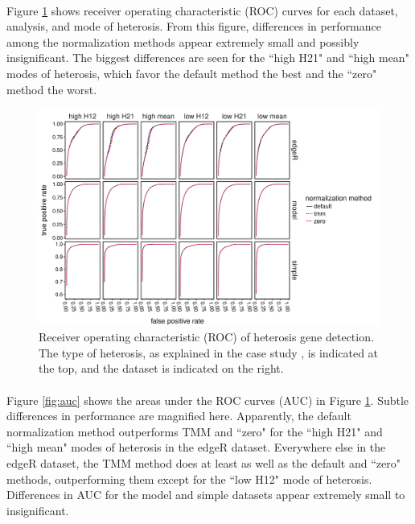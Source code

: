 \documentclass{article}
\begin{document}
\begin{flushleft}
\paragraph{} Figure \ref{fig:roc} shows receiver operating characteristic (ROC) curves for each dataset, analysis, and mode of heterosis. From this figure, differences in performance among the normalization methods appear extremely small and possibly insignificant. The biggest differences are seen for the ``high H21" and ``high mean" modes of heterosis, which favor the default method the best and the ``zero" method the worst. 

\begin{figure}[htbp]
   \centering
   \includegraphics[scale=0.5]{roc}
   \caption{Receiver operating characteristic (ROC) of heterosis gene detection. The type of heterosis, as explained in the case study \cite{thesispaper2}, is indicated at the top, and the dataset is indicated on the right.}
   \label{fig:roc}
\end{figure}

\paragraph{} Figure \ref{fig:auc} shows the areas under the ROC curves (AUC) in Figure \ref{fig:roc}. Subtle differences in performance are magnified here. Apparently, the default normalization method outperforms TMM and ``zero" for the ``high H21" and ``high mean" modes of heterosis in the edgeR dataset. Everywhere else in the edgeR dataset, the TMM method does at least as well as the default and ``zero" methods, outperforming them except for the ``low H12" mode of heterosis. Differences in AUC for the model and simple datasets appear extremely small to insignificant.


\end{flushleft}
\end{document}
